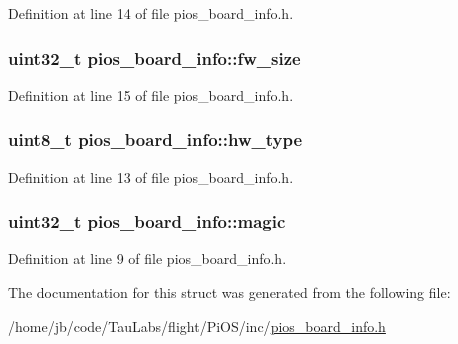\-Definition at line 14 of file pios\-\_\-board\-\_\-info.\-h.

\hypertarget{structpios__board__info_a0b8e1fae0f06a06384829d6f2dfe5f20}{
\subsubsection[{fw\-\_\-size}]{\setlength{\rightskip}{0pt plus 5cm}uint32\-\_\-t {\bf pios\-\_\-board\-\_\-info\-::fw\-\_\-size}}}\label{structpios__board__info_a0b8e1fae0f06a06384829d6f2dfe5f20}


\-Definition at line 15 of file pios\-\_\-board\-\_\-info.\-h.

\hypertarget{structpios__board__info_a3a94af2d49603c2cbef32e8b56e5c057}{
\subsubsection[{hw\-\_\-type}]{\setlength{\rightskip}{0pt plus 5cm}uint8\-\_\-t {\bf pios\-\_\-board\-\_\-info\-::hw\-\_\-type}}}\label{structpios__board__info_a3a94af2d49603c2cbef32e8b56e5c057}


\-Definition at line 13 of file pios\-\_\-board\-\_\-info.\-h.

\hypertarget{structpios__board__info_aab5bc5b7905e46df6cc7fd90fdb318d4}{
\subsubsection[{magic}]{\setlength{\rightskip}{0pt plus 5cm}uint32\-\_\-t {\bf pios\-\_\-board\-\_\-info\-::magic}}}\label{structpios__board__info_aab5bc5b7905e46df6cc7fd90fdb318d4}


\-Definition at line 9 of file pios\-\_\-board\-\_\-info.\-h.



\-The documentation for this struct was generated from the following file\-:\begin{DoxyCompactItemize}
\item 
/home/jb/code/\-Tau\-Labs/flight/\-Pi\-O\-S/inc/\hyperlink{pios__board__info_8h}{pios\-\_\-board\-\_\-info.\-h}\end{DoxyCompactItemize}
